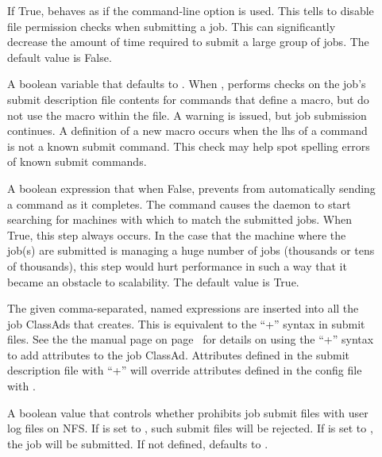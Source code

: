 \begin{description}
\item[] \label{param:SubmitSkipFilechecks}
  If True,  behaves as if the  
  command-line option is used.
  This tells  to disable file permission checks when
  submitting a job.
  This can significantly decrease the amount of time required to submit
  a large group of jobs.
  The default value is False.

\item[]
  \label{param:WarnOnUnusedSubmitFileMacros}  A boolean variable that
  defaults to .  When , 
  performs checks on the job's submit description file contents
  for commands that define a macro, but do not use the macro within
  the file.
  A warning is issued, but job submission continues.
  A definition of a new macro occurs when the lhs of a command is not
  a known submit command.  This check may help spot spelling errors
  of known submit commands.

\item[] \label{param:SubmitSendReschedule}
  A boolean expression that when False, prevents  from
  automatically sending a  command as it completes.
  The  command causes the  daemon
  to start searching for machines with which to match the submitted
  jobs.  When True, this step always occurs.
  In the case that the machine where the job(s) are submitted is
  managing a huge number of jobs (thousands or tens of thousands),
  this step would hurt performance in such a way that it became
  an obstacle to scalability.
  The default value is True.

\item[] \label{param:SubmitExprs}
  The given comma-separated, named expressions are inserted into all 
  the job ClassAds that  creates.  This is equivalent
  to the ``+'' syntax in submit files.  See the
  the  manual page
  on page~\pageref{man-condor-submit} for details on using the ``+''
  syntax to add attributes to the job ClassAd.
  Attributes defined in the submit description file with ``+'' will
  override attributes defined in the config file with
  . 

\item[] \label{param:LogOnNfsIsError}
  A boolean value that controls whether  prohibits
  job submit files with user log files on NFS.  If
   is set to , such
  submit files will be rejected.  If 
  is set to ,
  the job will be submitted.  If not defined,
   defaults to .


\end{description}
